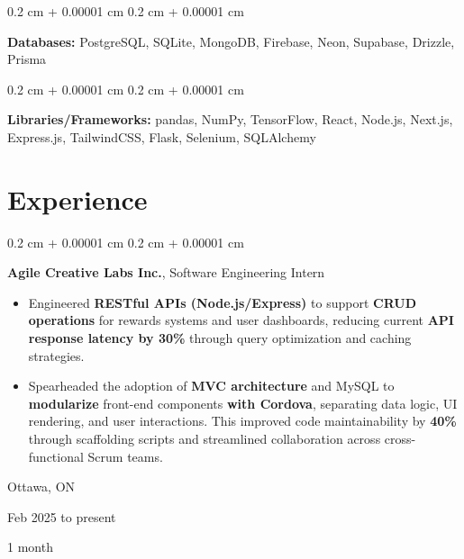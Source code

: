 \documentclass[10pt, letterpaper]{article}
\newenvironment{highlights}{
    \begin{itemize}[
        topsep=0.10 cm,
        parsep=0.10 cm,
        partopsep=0pt,
        itemsep=0pt,
        leftmargin=0.4 cm + 10pt
    ]
}{
    \end{itemize}
} %
\newenvironment{onecolentry}{
    \begin{adjustwidth}{
        0.2 cm + 0.00001 cm
    }{
        0.2 cm + 0.00001 cm
    }
}{
    \end{adjustwidth}
} %
\newenvironment{twocolentry}[2][]{
    \onecolentry
    \def\secondColumn{#2}
    \setcolumnwidth{\fill, 2.5 cm}
    \begin{paracol}{2}
}{
    \switchcolumn \raggedleft \secondColumn
    \end{paracol}
    \endonecolentry
} %
\begin{document}
        \vspace{0.05 cm}

        \begin{onecolentry}
            \textbf{Databases:} PostgreSQL, SQLite, MongoDB, Firebase, Neon, Supabase, Drizzle, Prisma
        \end{onecolentry}

        \vspace{0.05 cm}

        \begin{onecolentry}
            \textbf{Libraries/Frameworks:} pandas, NumPy, TensorFlow, React, Node.js, Next.js, Express.js, TailwindCSS, Flask, Selenium, SQLAlchemy
        \end{onecolentry}


    
    \section{Experience}



        
        \begin{twocolentry}{
            Ottawa, ON

        Feb 2025 to present

        1 month
        }
            \textbf{Agile Creative Labs Inc.}, Software Engineering Intern
            \begin{highlights}
                \item Engineered \textbf{RESTful APIs (Node.js/Express)} to support \textbf{CRUD operations} for rewards systems and user dashboards, reducing current \textbf{API response latency by 30\%} through query optimization and caching strategies.
                \item Spearheaded the adoption of \textbf{MVC architecture} and MySQL to \textbf{modularize} front-end components \textbf{with Cordova}, separating data logic, UI rendering, and user interactions. This improved code maintainability by \textbf{40\%} through scaffolding scripts and streamlined collaboration across cross-functional Scrum teams.
            \end{highlights}
        \end{twocolentry}


        \vspace{0.05 cm}
\end{document}
